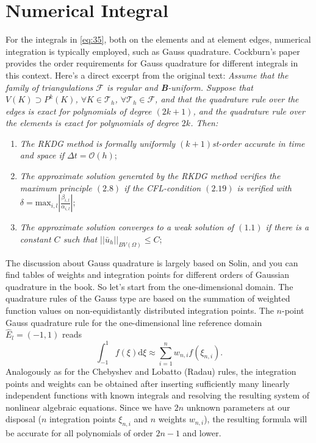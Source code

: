 \documentclass{develop-note}
\begin{document}
\section{Numerical Integral}

For the integrals in \autoref{eq:35}, both on the elements and at element edges, numerical integration is typically employed, such as Gauss quadrature. Cockburn's paper\cite{cockburnRungeKuttaLocalProjection1990} provides the order requirements for Gauss quadrature for different integrals in this context. Here's a direct excerpt from the original text: \textit{Assume that the family of triangulations $\mathscr{F}$ is regular and \textbf{B}-uniform. Suppose that $V(K)\supset P^{k}(K)$, $\forall K\in\mathscr{T}_{h}$, $\forall\mathscr{T}_{h}\in\mathscr{F}$, and that the quadrature rule over the edges is exact for polynomials of degree $(2k +1)$, and the quadrature rule over the elements is exact for polynomials of degree $2k$. Then:}
\begin{enumerate}
  \item \textit{The RKDG method is formally uniformly $(k+1)$st-order accurate in time and space if $\Delta t=\mathcal{O}(h)$};
  \item \textit{The approximate solution generated by the RKDG method verifies the maximum principle $(2.8)$ if the CFL-condition $(2.19)$ is verified with $\delta=\mathrm{max}_{i,l}\left|\frac{\beta_{i,l}}{\alpha_{i,l}}\right|$};
  \item \textit{The approximate solution converges to a weak solution of $(1.1)$ if there is a constant $C$ such that $||\bar{u}_{h}||_{BV(\Omega)}\le C$};
\end{enumerate}

The discussion about Gauss quadrature is largely based on Solin\cite{solinHigherOrderFiniteElement2003}, and you can find tables of weights and integration points for different orders of Gaussian quadrature in the book. So let's start from the one-dimensional domain. The quadrature rules of the Gauss type are based on the summation of weighted function values on non-equidistantly distributed integration points. The $n$-point Gauss quadrature rule for the one-dimensional line reference domain $\hat{E}_{l}=(-1,1)$ reads
\begin{equation}
  \int_{-1}^{1}f(\xi)\mathrm{d}\xi\approx\sum_{i=1}^{n}w_{n,i}f(\xi_{n,i}).
\end{equation}
Analogously as for the Chebyshev and Lobatto (Radau) rules, the integration points and weights can be obtained after inserting sufficiently many linearly independent functions with known integrals and resolving the resulting system of nonlinear algebraic equations. Since we have $2n$ unknown parameters at our disposal ($n$ integration points $\xi_{n,i}$ and $n$ weights $w_{n,i}$), the resulting formula will be accurate for all polynomials of order $2n-1$ and lower.
\end{document}
